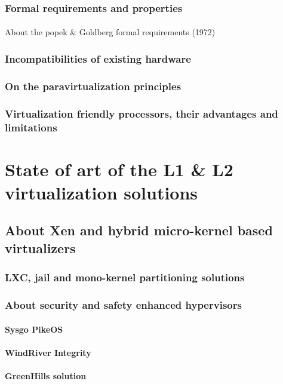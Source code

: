 \subsubsection{Formal requirements and properties}

\paragraph{}
About the popek \& Goldberg formal requirements (1972)

\subsubsection{Incompatibilities of existing hardware}

\subsubsection{On the paravirtualization principles}

\subsubsection{Virtualization friendly processors, their advantages and limitations}

\section{State of art of the L1 \& L2 virtualization solutions}

\subsection{About Xen and hybrid micro-kernel based virtualizers}

\subsubsection{LXC, jail and mono-kernel partitioning solutions}

\subsubsection{About security and safety enhanced hypervisors}

\paragraph{Sysgo PikeOS}

\paragraph{WindRiver Integrity}

\paragraph{GreenHills solution}


